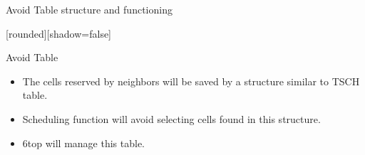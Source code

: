 \begin{withoutheadline}
\begin{frame}{Avoid Table structure and functioning}


[rounded][shadow=false]
\begin{block}{Avoid Table}
    \begin{itemize}
     \item The cells reserved by neighbors will be saved by a structure similar to TSCH table. 
    \item<2-> Scheduling function will avoid selecting cells found in this structure. 
    \item<3-> 6top will manage this table.
    \end{itemize}
    \end{block}
    
    
\begin{figure}[p]

 
 
\end{figure}



\end{frame}
\end{withoutheadline}



